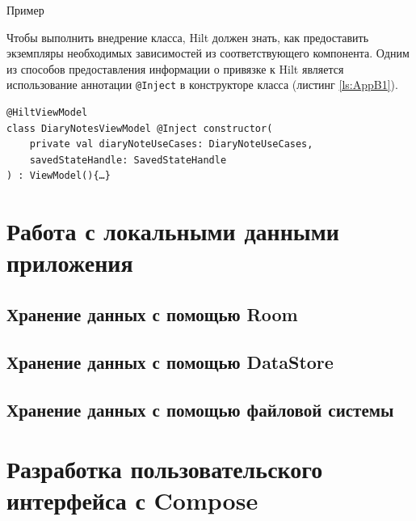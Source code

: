 Пример 


Чтобы выполнить внедрение класса, Hilt должен знать, как предоставить экземпляры необходимых зависимостей из соответствующего компонента. Одним из способов предоставления информации о привязке к Hilt является использование аннотации \verb|@Inject| в конструкторе класса (листинг \ref{ls:AppB1}).

\begin{lstlisting}[caption={Пример аннотации Inject}, label={ls:AppB1}]
@HiltViewModel
class DiaryNotesViewModel @Inject constructor(
    private val diaryNoteUseCases: DiaryNoteUseCases,
    savedStateHandle: SavedStateHandle
) : ViewModel(){…}
\end{lstlisting}




\section{Работа с локальными данными приложения}

\subsection{Хранение данных с помощью Room}
\subsection{Хранение данных с помощью DataStore}
\subsection{Хранение данных с помощью файловой системы}

\section{Разработка пользовательского интерфейса с Compose}




